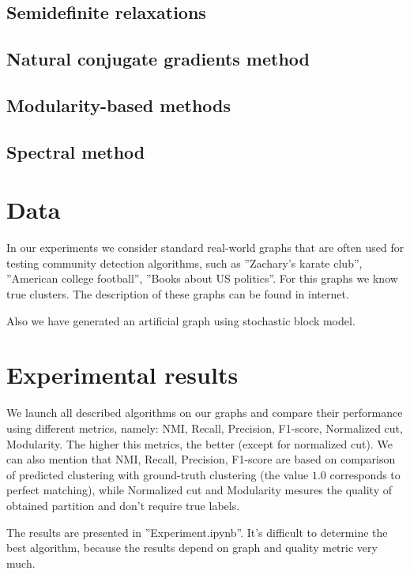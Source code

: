 \documentclass[11pt,a4paper]{extarticle}
\begin{document}
	\subsection{Semidefinite relaxations}
		
	\subsection{Natural conjugate gradients method}
		
	\subsection{Modularity-based methods}
		
	\subsection{Spectral method}
		
		
\section{Data}

	In our experiments we consider standard real-world graphs that are often used for testing community detection algorithms, such as ''Zachary's karate club'', ''American college football'', ''Books about US politics''. For this graphs we know true clusters. The description of these graphs can be found in internet.

	Also we have generated an artificial graph using stochastic block model.

\section{Experimental results}
	We launch all described algorithms on our graphs and compare their performance using different metrics, namely: NMI, Recall, Precision, F1-score, Normalized cut, Modularity.
	The higher this metrics, the better (except for normalized cut). We can also mention that NMI, Recall, Precision, F1-score are based on comparison of predicted clustering with ground-truth clustering (the value $1.0$ corresponds to perfect matching), while Normalized cut and Modularity mesures the quality of obtained partition and don't require true labels.

	The results are presented in ''Experiment.ipynb''. It's difficult to determine the best algorithm, because the results depend on graph and quality metric very much.
\end{document}
